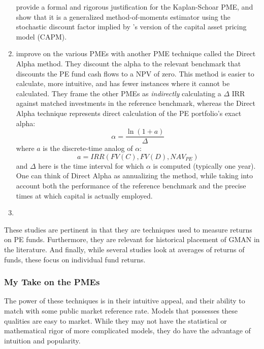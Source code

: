 \documentclass[final,5p,times,twocolumn,authoryear]{elsarticle}
\begin{document}
\begin{enumerate}[resume, label=(\roman*)]
	\cite{Sorensen2013} provide a formal and rigorous justification for the Kaplan-Schoar PME, and show that it is a generalized method-of-moments estimator using the stochastic discount factor implied by \cite{Rubinstein1976}'s version of the capital asset pricing model (CAPM).

	\item \cite{Gredil2014} improve on the various PMEs with another PME technique called the Direct Alpha method. They discount the alpha to the relevant benchmark that discounts the PE fund cash flows to a NPV of zero. This method is easier to calculate, more intuitive, and has fewer instances where it cannot be calculated. They frame the other PMEs as \emph{indirectly} calculating a $\Delta$ IRR against matched investments in the reference benchmark, whereas the Direct Alpha technique represents direct calculation of the PE portfolio's exact alpha:
	\begin{equation}
		\alpha = \frac{\ln \left(1 + a \right)}{\Delta}
	\end{equation}
	where $a$ is the discrete-time analog of $\alpha$:
	\begin{equation}
		a = IRR(FV(C), FV(D), NAV_{PE})
	\end{equation}
	and $\Delta$ here is the time interval for which $\alpha$ is computed (typically one year). One can think of Direct Alpha as annualizing the \cite{Kaplan2005} method, while taking into account both the performance of the reference benchmark and the precise times at which capital is actually employed.	

	\item \cite{Sorensen2013}

\end{enumerate}

These studies are pertinent in that they are techniques used to measure returns on PE funds. Furthermore, they are relevant for historical placement of GMAN in the literature. And finally, while several studies look at averages of returns of funds, these focus on individual fund returns. 

\subsubsection{My Take on the PMEs}
The power of these techniques is in their intuitive appeal, and their ability to match with some public market reference rate. Models that possesses these qualities are easy to market. While they may not have the statistical or mathematical rigor of more complicated models, they do have the advantage of intuition and popularity. 
\end{document}
